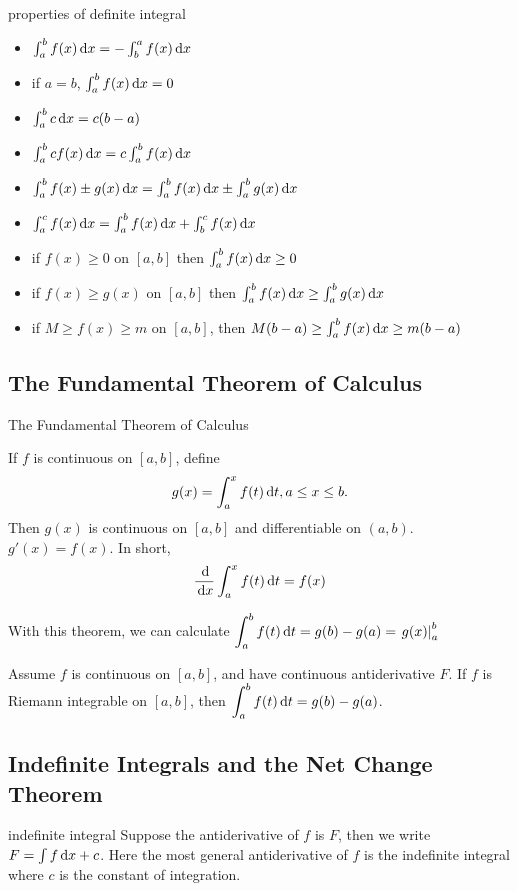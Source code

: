 \documentclass[Calculus 1 Recitation.tex]{subfiles}
\begin{document}
\begin{myleftlinebox}
	properties of definite integral
	\tcblower
	\begin{itemize}
		\item $\int_a^b f(x)\,\mathrm{d} x = -\int_b^a f(x) \,\mathrm{d} x$
		\item if $a=b$, $\int_a^b f(x)\,\mathrm{d} x =0$
		\item $\int_a^b c\,\mathrm{d} x =c(b-a)$
		\item $\int_a^b cf(x)\,\mathrm{d} x =c\int_a^b f(x)\,\mathrm{d} x $
		\item $\int_a^b f(x)\pm g(x)\,\mathrm{d} x = \int_a^b f(x)\,\mathrm{d} x \pm \int_a^b g(x)\,\mathrm{d} x$
		\item $\int_a^c f(x)\,\mathrm{d} x = \int_a^b f(x)\,\mathrm{d} x +\int_b^c f(x)\,\mathrm{d} x$
		\item if $f(x)\geq 0$ on $[a,b]$ then $\int_a^b f(x)\,\mathrm{d} x \geq 0$
		\item if $f(x)\geq g(x)$ on $[a,b]$ then $\int_a^b f(x)\,\mathrm{d} x \geq \int_a^b g(x)\,\mathrm{d} x$
		\item if $M\geq f(x)\geq m$ on $[a,b]$, then $M(b-a) \geq \int_a^b f(x)\,\mathrm{d} x \geq m(b-a)$
	\end{itemize}
\end{myleftlinebox}

\subsection{The Fundamental Theorem of Calculus}
\begin{myleftlinebox}
	The Fundamental Theorem of Calculus
	\tcblower
	\begin{theorem}
		If $f$ is continuous on $[a,b]$, define 
		\[g(x)=\int_{a}^x f(t)\,\mathrm{d} t, a\leq x\leq b.\]
		Then $g(x)$ is continuous on $[a,b]$ and differentiable on $(a,b)$. $g'(x)=f(x)$. In short,
		\[\frac{\,\mathrm{d}}{\,\mathrm{d} x}\int_a^x f(t)\,\mathrm{d} t=f(x)\]
	\end{theorem}
	With this theorem, we can calculate $\displaystyle\int_a^b f(t)\,\mathrm{d} t=g(b)-g(a)=\left.g(x)\right|_a^b$
	\begin{theorem}
		Assume $f$ is continuous on $[a,b]$, and have continuous antiderivative $F$. If $f$ is Riemann integrable on $[a,b]$, then $\displaystyle\int_a^b f(t)\,\mathrm{d} t=g(b)-g(a)$.
	\end{theorem}
\end{myleftlinebox}

\subsection{Indefinite Integrals and the Net Change Theorem}
\begin{myleftlinebox}
	indefinite integral
	\tcblower
	Suppose the antiderivative of $f$ is $F$, then we write $F = \int f \,\mathrm{d} x +c$. Here the most general antiderivative of $f$ is the indefinite integral where $c$ is the constant of integration.
\end{myleftlinebox}
\end{document}
